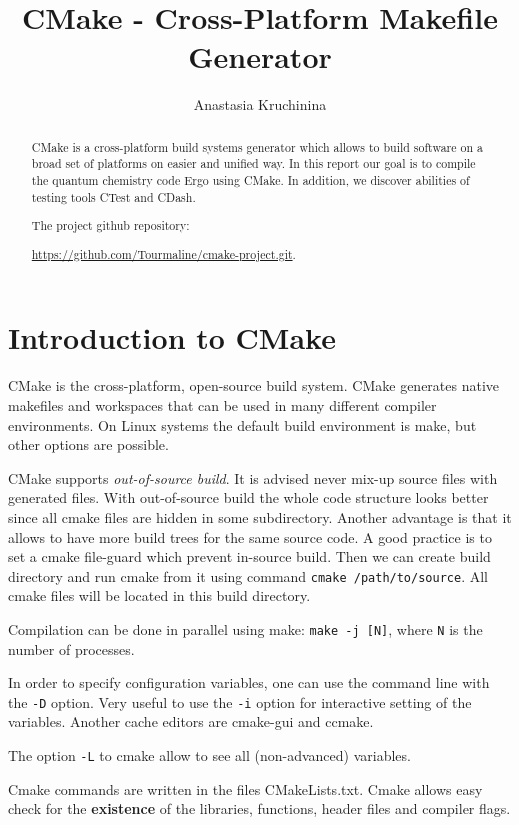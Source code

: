 \documentclass[a4paper,10pt]{article}
\title{CMake - Cross-Platform Makefile Generator}
\author{Anastasia Kruchinina}
\begin{document}
\maketitle
\tableofcontents

\begin{abstract}
CMake is a cross-platform build systems generator which allows to build software on a broad set of platforms on easier and unified way. In this report our goal is to compile the quantum chemistry code Ergo using CMake. In addition, we discover abilities of testing tools CTest and CDash.

\vskip 10pt

The project github repository: 

\url{https://github.com/Tourmaline/cmake-project.git}.

\end{abstract}

\section{Introduction to CMake}

CMake is the cross-platform, open-source build system. CMake generates native makefiles and workspaces that can be used in many different compiler environments. On Linux systems the default build environment is make, but other options are possible.

CMake supports \textit{out-of-source build}. It is advised never mix-up source files with generated files. With out-of-source build the whole code structure looks better since all cmake files are hidden in some subdirectory. Another advantage is that it allows to have more build trees for the same source code.
A good practice is to set a cmake file-guard which prevent in-source build. Then we can create build directory and run cmake from it using command \texttt{cmake /path/to/source}.
All cmake files will be located in this build directory.

Compilation can be done in parallel using make: \texttt{make -j [N]}, where \texttt{N} is the number of processes.

In order to specify configuration variables, one can use the command line with the \texttt{-D} option. Very useful to use the \texttt{-i} option for interactive setting of the variables. Another cache editors are cmake-gui and ccmake.

The option \texttt{-L} to cmake allow to see all (non-advanced) variables.

Cmake commands are written in the files CMakeLists.txt.
Cmake allows easy check for the \textbf{existence} of the libraries, functions, header files and compiler flags.
\end{document}
